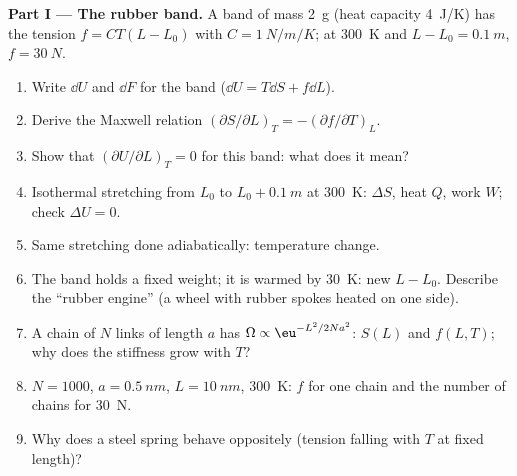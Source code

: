 \begin{problem}\label{pb:b2:thermodynamic-potentials:1}
\textbf{Part I --- The rubber band.}
A band of mass \qty{2}{g} (heat capacity \qty{4}{J/K}) has the tension
$f = CT(L - L_0)$ with $C = \qty{1}{N/m/K}$; at \qty{300}{K} and $L - L_0 =
\qty{0.1}{m}$, $f = \qty{30}{N}$.
\begin{enumerate}
  \item Write $\dd U$ and $\dd F$ for the band ($\dd U = T\dd S + f\dd L$).
  \item Derive the Maxwell relation $(\partial S/\partial L)_T = -(\partial
        f/\partial T)_L$.
  \item Show that $(\partial U/\partial L)_T = 0$ for this band: what does
        it mean?
  \item Isothermal stretching from $L_0$ to $L_0 + \qty{0.1}{m}$ at
        \qty{300}{K}: $\Delta S$, heat $Q$, work $W$; check $\Delta U = 0$.
  \item Same stretching done adiabatically: temperature change.
  \item The band holds a fixed weight; it is warmed by \qty{30}{K}: new
        $L - L_0$. Describe the ``rubber engine'' (a wheel with rubber
        spokes heated on one side).
  \item A chain of $N$ links of length $a$ has $\Omega \propto \eu^{-L^2/2Na^2}$:
        $S(L)$ and $f(L,T)$; why does the stiffness grow with $T$?
  \item $N = 1000$, $a = \qty{0.5}{nm}$, $L = \qty{10}{nm}$, \qty{300}{K}: $f$
        for one chain and the number of chains for \qty{30}{N}.
  \item Why does a steel spring behave oppositely (tension falling
        with $T$ at fixed length)?
\end{enumerate}


\end{problem}
